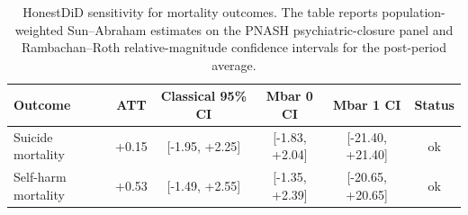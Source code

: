 \begin{table}[!htbp]\centering
\caption{HonestDiD sensitivity for mortality outcomes. The table reports population-weighted Sun--Abraham estimates on the PNASH psychiatric-closure panel and Rambachan--Roth relative-magnitude confidence intervals for the post-period average.}
\label{tab:honestdid-mortality}
\small
\begin{tabular}{lccccc}
\toprule
Outcome & ATT & Classical 95\% CI & Mbar 0 CI & Mbar 1 CI & Status \\
\midrule
Suicide mortality & +0.15 & [-1.95, +2.25] & [-1.83, +2.04] & [-21.40, +21.40] & ok \\
Self-harm mortality & +0.53 & [-1.49, +2.55] & [-1.35, +2.39] & [-20.65, +20.65] & ok \\
\bottomrule
\end{tabular}
\end{table}
